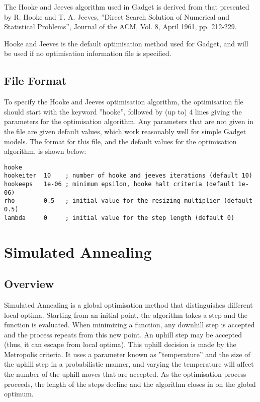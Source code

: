 \documentclass [a4paper, 10pt]{book}
\begin{document}
\bigskip
The Hooke and Jeeves algorithm used in Gadget is derived from that presented by R. Hooke and T. A. Jeeves, ''Direct Search Solution of Numerical and Statistical Problems'', Journal of the ACM, Vol. 8, April 1961, pp. 212-229.

\bigskip
Hooke and Jeeves is the default optimisation method used for Gadget, and will be used if no optimisation information file is specified.

\subsection{File Format}
To specify the Hooke and Jeeves optimisation algorithm, the optimisation file should start with the keyword ''hooke'', followed by (up to) 4 lines giving the parameters for the optimisation algorithm.  Any parameters that are not given in the file are given default values, which work reasonably well for simple Gadget models.  The format for this file, and the default values for the optimisation algorithm, is shown below:

{\small\begin{verbatim}
hooke
hookeiter  10    ; number of hooke and jeeves iterations (default 10)
hookeeps   1e-06 ; minimum epsilon, hooke halt criteria (default 1e-06)
rho        0.5   ; initial value for the resizing multiplier (default 0.5)
lambda     0     ; initial value for the step length (default 0)
\end{verbatim}}

\section{Simulated Annealing}\label{sec:simann}
\subsection{Overview}
Simulated Annealing is a global optimisation method that distinguishes different local optima.  Starting from an initial point, the algorithm takes a step and the function is evaluated.  When minimizing a function, any downhill step is accepted and the process repeats from this new point.  An uphill step may be accepted (thus, it can escape from local optima).  This uphill decision is made by the Metropolis criteria.  It uses a parameter known as ''temperature'' and the size of the uphill step in a probabilistic manner, and varying the temperature will affect the number of the uphill moves that are accepted.  As the optimisation process proceeds, the length of the steps decline and the algorithm closes in on the global optimum.
\end{document}
